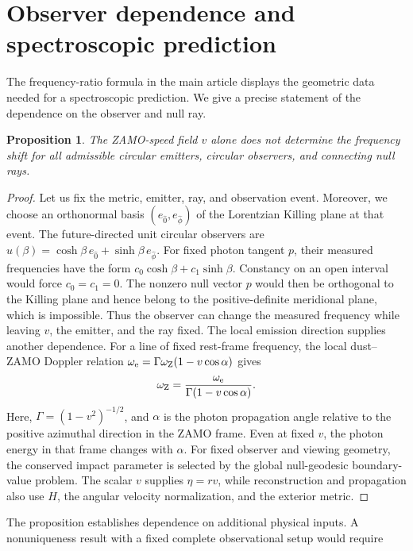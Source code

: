 \documentclass[11pt,a4paper]{article}
\numberwithin{equation}{section}
\theoremstyle{plain}
\newtheorem{proposition}{Proposition}
\theoremstyle{definition}
\theoremstyle{remark}
\begin{document}
\section{Observer dependence and spectroscopic prediction}
\label{supp:observables}

The frequency-ratio formula in the main article displays the geometric data
needed for a spectroscopic prediction. We give a precise statement of the
dependence on the observer and null ray.
\begin{proposition}\label{prop:zamo-nonidentifiability}
The ZAMO-speed field $v$ alone does not determine the frequency shift for all
admissible circular emitters, circular observers, and connecting null rays.
\end{proposition}
\begin{proof}
Let us fix the metric, emitter, ray, and observation event. Moreover, we choose an orthonormal basis $(e_{\hat0},e_{\hat\phi})$ of the Lorentzian Killing plane at that event. The future-directed unit circular observers are $u(\beta)=\cosh\beta\,e_{\hat0}+\sinh\beta\,e_{\hat\phi}$. For fixed photon tangent $p$, their measured frequencies have the form $c_0\cosh\beta+c_1\sinh\beta$. Constancy on an open interval would force $c_0=c_1=0$. The nonzero null vector $p$ would then be orthogonal to the Killing plane and hence belong to the positive-definite meridional plane, which is impossible. Thus the observer can change the measured frequency while leaving $v$, the emitter, and the ray fixed. The local emission direction supplies another dependence. For a line of fixed rest-frame frequency, the local dust--ZAMO Doppler relation
$\omega_{\rm e}=\Gamma\omega_{\rm Z}(1-v\cos\alpha)$ gives
\begin{equation}\label{eq:zamo-photon-energy-fixed-line}
\omega_{\rm Z}=\frac{\omega_{\rm e}}{\Gamma(1-v\cos\alpha)}.
\end{equation}
Here, $\Gamma=(1-v^2)^{-1/2}$, and $\alpha$ is the photon propagation angle relative to the positive azimuthal direction in the ZAMO frame. Even at fixed $v$, the photon energy in that frame changes with $\alpha$. For fixed observer and viewing geometry, the conserved impact parameter is selected by the global null-geodesic boundary-value problem. The scalar $v$ supplies $\eta=rv$, while reconstruction and propagation
also use $H$, the angular velocity normalization, and the exterior metric.
\end{proof}
The proposition establishes dependence on additional physical inputs. A
nonuniqueness result with a fixed complete observational setup would require
\end{document}
